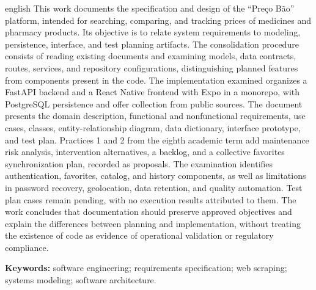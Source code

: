 \documentclass[
    12pt,
    openright,
    oneside,
    a4paper,
    english,
    brazil
    ]{abntex2}
\begin{document}
\begin{resumo}[Abstract]
\begin{otherlanguage*}{english}
This work documents the specification and design of the ``Preço Bão'' platform, intended for searching, comparing, and tracking prices of medicines and pharmacy products. Its objective is to relate system requirements to modeling, persistence, interface, and test planning artifacts. The consolidation procedure consists of reading existing documents and examining models, data contracts, routes, services, and repository configurations, distinguishing planned features from components present in the code. The implementation examined organizes a FastAPI backend and a React Native frontend with Expo in a monorepo, with PostgreSQL persistence and offer collection from public sources. The document presents the domain description, functional and nonfunctional requirements, use cases, classes, entity-relationship diagram, data dictionary, interface prototype, and test plan. Practices 1 and 2 from the eighth academic term add maintenance risk analysis, intervention alternatives, a backlog, and a collective favorites synchronization plan, recorded as proposals. The examination identifies authentication, favorites, catalog, and history components, as well as limitations in password recovery, geolocation, data retention, and quality automation. Test plan cases remain pending, with no execution results attributed to them. The work concludes that documentation should preserve approved objectives and explain the differences between planning and implementation, without treating the existence of code as evidence of operational validation or regulatory compliance.
\par\vspace{\onelineskip}
\noindent
\textbf{Keywords:} software engineering; requirements specification; web scraping; systems modeling; software architecture.
\end{otherlanguage*}
\end{resumo}

\listoffigures*
\cleardoublepage


\listofquadros*
\cleardoublepage

\tableofcontents*
\cleardoublepage

\textual







\postextual


\end{document}
